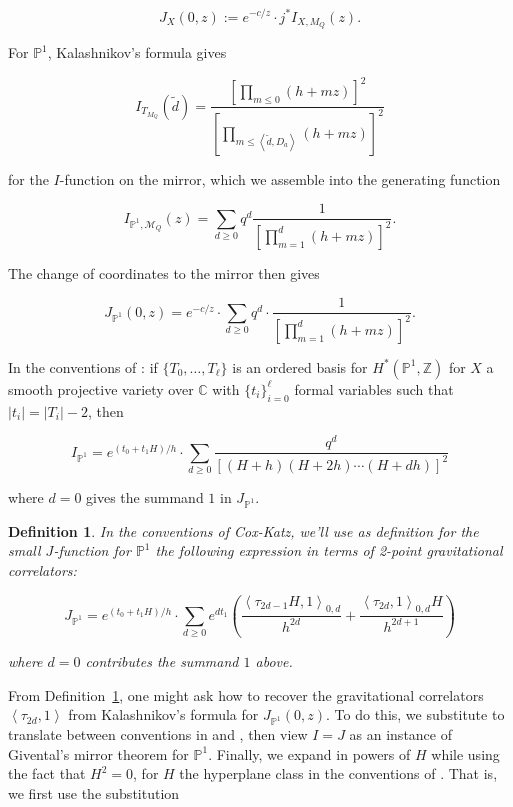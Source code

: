 \documentclass{amsart}
\newtheorem{definition}[theorem]{Definition}
\newcommand{\PP}{\mathbb{P}}\newcommand{\A}{\mathbb{A}}\newcommand{\Z}{\mathbb{Z}}\newcommand{\C}{\mathbb{C}}\newcommand{\N}{\mathbb{N}}\newcommand{\T}{\mathbb{T}}
\begin{document}
\[ J_X(0,z) := e^{-c/z} \cdot j^* I_{X,M_Q}(z). \]



For $\PP^1$, Kalashnikov's formula gives

\[ I_{T_{M_Q}}(\tilde{d}) = \frac{ \left[ \prod_{m\leq 0} ({h}+mz ) \right]^2 }{ \left[ \prod_{m\leq \left< \tilde{d}, D_a \right>}( h + mz) \right]^2 }\]

for the $I$-function on the mirror, which we assemble into the generating function 

\[ I_{\PP^1, \mathcal{M}_Q}(z) = \sum_{d\geq 0} q^d \frac{1}{ \left[ \prod_{m=1}^d (h+mz)\right]^2 }.\]

The change of coordinates to the mirror then gives

\begin{equation} \label{eqn: KalashJP1} J_{\PP^1}(0,z) = e^{-c/z} \cdot \sum_{d\geq 0} q^d \cdot \frac{ 1}{ \left[ \prod_{m=1}^d (h+mz) \right]^2 }. \end{equation} 

In the conventions of \cite{coxkatxMSAG}: if $\{T_0, \dots, T_\ell\}$ is an ordered basis for $H^*(\PP^1,\Z)$ for $X$ a smooth projective variety over $\C$ with $\{t_i\}_{i=0}^\ell$ formal variables such that $|t_i| = |T_i|-2$, then

\begin{equation} \label{eqn: coxKatzIP1} I_{\PP^1} = e^{(t_0 + t_1H )/h} \cdot \sum_{d\geq 0} \frac{ q^d}{ \left[ (H+h)(H+2h)\cdots (H+dh)\right]^2}  \end{equation}

where $d=0$ gives the summand $1$ in $J_{\PP^1}$. 


\begin{definition} \label{defn: coxKatzJP1} \cite[357]{coxkatxMSAG} In the conventions of Cox-Katz, we'll use as definition for the small $J$-function for $\PP^1$ the following expression in terms of 2-point gravitational correlators: 

\[ J_{\PP^1} = e^{(t_0 + t_1H)/h} \cdot \sum_{d\geq 0} e^{dt_1} \left( \frac{ \left< \tau_{2d-1}H,1\right>_{0,d} }{h^{2d}} + \frac{ \left< \tau_{2d},1\right>_{0,d} H }{h^{2d+1} } \right) \]

where $d=0$ contributes the summand $1$ above. 

\end{definition}

From Definition~\ref{defn: coxKatzJP1}, one might ask how to recover the gravitational correlators $\left<\tau_{2d},1\right>$ from Kalashnikov's formula for $J_{\PP^1}(0,z)$. To do this, we substitute to translate between conventions in \cite{Kalashnikov} and \cite{coxhgscoordinatering}, then view $I=J$ as an instance of Givental's mirror theorem for $\PP^1$. Finally, we expand in powers of $H$ while using the fact that $H^2=0$, for $H$ the hyperplane class in the conventions of \cite{coxkatxMSAG}. That is, we first use the substitution
\end{document}
